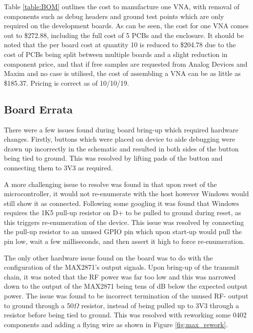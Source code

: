 Table \ref{table:BOM} outlines the cost to manufacture one VNA, with removal of components such as debug headers and ground test points which are only required on the development boards. As can be seen, the cost for one VNA comes out to \$272.88, including the full cost of 5 PCBs and the enclosure. It should be noted that the per board cost at quantity 10 is reduced to \$204.78 due to the cost of PCBs being split between multiple boards and a slight reduction in component price, and that if free samples are requested from Analog Devices and Maxim and no case is utilised, the cost of assembling a VNA can be as little as \$185.37. Pricing is correct as of 10/10/19.

\subsection{Board Errata}
There were a few issues found during board bring-up which required hardware changes. Firstly, buttons which were placed on device to aide debugging were drawn up incorrectly in the schematic and resulted in both sides of the button being tied to ground. This was resolved by lifting pads of the button and connecting them to 3V3 as required.

A more challenging issue to resolve was found in that upon reset of the microcontroller, it would not re-enumerate with the host however Windows would still show it as connected. Following some googling it was found that Windows requires the 1K5 pull-up resistor on D+ to be pulled to ground during reset, as this triggers re-enumeration of the device. This issue was resolved by connecting the pull-up resistor to an unused GPIO pin which upon start-up would pull the pin low, wait a few milliseconds, and then assert it high to force re-enumeration. 

The only other hardware issue found on the board was to do with the configuration of the MAX2871's output signals. Upon bring-up of the transmit chain, it was noted that the RF power was far too low and this was narrowed down to the output of the MAX2871 being tens of dB below the expected output power. The issue was found to be incorrect termination of the unused RF- output to ground through a 50$\Omega$ resistor, instead of being pulled up to 3V3 through a resistor before being tied to ground. This was resolved with reworking some 0402 components and adding a flying wire as shown in Figure \ref{fig:max_rework}.

